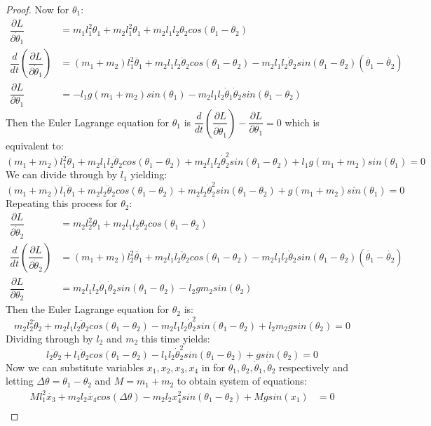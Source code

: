 \documentclass[12pt]{article}
\begin{document}
\begin{proof}
Now for $\theta_1$:
\begin{align}
\dfrac{\partial L}{\partial \dot{\theta}_1} &= m_1l_1^2\theta_1 + m_2l_1^2\theta_1 + m_2l_1l_2\theta_2cos(\theta_1 - \theta_2)  \\
\dfrac{d}{dt}(\dfrac{\partial L}{\partial \dot{\theta}_1}) &= (m_1+m_2)l_1^2\ddot{\theta_1} + m_2l_1l_2\ddot{\theta}_2 cos(\theta_1 - \theta_2) - m_2l_1l_2\dot{\theta}_2sin(\theta_1-\theta_2)(\dot{\theta_1}-\dot{\theta_2}) \\
\dfrac{\partial L}{\partial \theta_1} &= -l_1g(m_1+m_2)sin(\theta_1) - m_2l_1l_2\dot{\theta}_1 \dot{\theta}_2 sin(\theta_1-\theta_2)
\end{align}
Then the Euler Lagrange equation for $\theta_1$ is $\dfrac{d}{dt}(\dfrac{\partial L}{\partial \dot{\theta}_1}) - \dfrac{\partial L}{\partial \theta_1} = 0$ which is equivalent to:
\[(m_1+m_2)l_1^2\ddot{\theta}_1 + m_2l_1l_2\ddot{\theta}_2cos(\theta_1-\theta_2)+m_2l_1l_2\dot{\theta}_2^2sin(\theta_1-\theta_2) + l_1g(m_1+m_2)sin(\theta_1) = 0\]
We can divide through by $l_1$ yielding:
\[(m_1+m_2)l_1\ddot{\theta}_1 + m_2l_2\ddot{\theta}_2cos(\theta_1-\theta_2)+m_2l_2\dot{\theta}_2^2sin(\theta_1-\theta_2) + g(m_1+m_2)sin(\theta_1) = 0\]
Repeating this process for $\theta_2$:
\begin{align}
\dfrac{\partial L}{\partial \dot{\theta}_2} &=  m_2l_2^2\theta_1 + m_2l_1l_2\theta_2cos(\theta_1 - \theta_2)  \\
\dfrac{d}{dt}(\dfrac{\partial L}{\partial \dot{\theta}_2}) &= (m_1+m_2)l_2^2\ddot{\theta_1} + m_2l_1l_2\ddot{\theta}_2 cos(\theta_1 - \theta_2) - m_2l_1l_2\dot{\theta}_2sin(\theta_1-\theta_2)(\dot{\theta_1}-\dot{\theta_2}) \\
\dfrac{\partial L}{\partial \theta_2} &= m_2l_1l_2\dot{\theta}_1 \dot{\theta}_2 sin(\theta_1-\theta_2) - l_2gm_2sin(\theta_2)
\end{align}
Then the Euler Lagrange equation for $\theta_2$ is:
\[m_2l_2^2\ddot{\theta}_2 + m_2l_1l_2\ddot{\theta}_2 cos(\theta_1 - \theta_2) - m_2l_1l_2\dot{\theta}_2^2sin(\theta_1-\theta_2) + l_2m_2gsin(\theta_2) = 0\]
Dividing through by $l_2$ and $m_2$ this time yields:
\[l_2\ddot{\theta}_2 + l_1\ddot{\theta}_2 cos(\theta_1 - \theta_2) - l_1l_2\dot{\theta}_2^2sin(\theta_1-\theta_2) + gsin(\theta_2) = 0\]
Now we can substitute variables $x_1,x_2,x_3,x_4$ in for $\theta_1,\theta_2, \dot{\theta}_1, \dot{\theta}_2$ respectively and letting $\Delta \theta = \theta_1-\theta_2$ and $M = m_1+m_2$ to obtain system of equations:
\begin{align*}
Ml_1^2\dot{x_3} + m_2l_2\dot{x_4}cos(\Delta \theta)-m_2l_2x_4^2sin(\theta_1-\theta_2) + Mgsin(x_1) &= 0 \\

\end{align*}
\end{proof}
\end{document}
